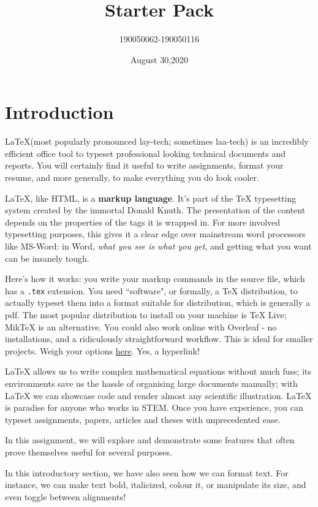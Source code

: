 \documentclass[a4paper]{article}
\title{\latex Starter Pack}
\author{190050062-190050116}
\date{August 30,2020}
\newcommand{\latex}{\LaTeX\xspace}
\newcommand{\tex}{\TeX\xspace}
\begin{document}
\maketitle
\tableofcontents
\thispagestyle{empty}
\setcounter{page}{0}
\newpage


\section{Introduction}
\latex (most popularly pronounced lay-tech; sometimes laa-tech) is an incredibly efficient office tool to typeset professional looking technical documents and reports. You will certainly find it useful to write assignments, format your resume, and more generally, to make everything you do look cooler.\par
\latex, like HTML, is a \textbf{markup language}. It's part of the \tex typesetting system created by the immortal Donald Knuth. The presentation of the content depends on the properties of the tags it is wrapped in. For more involved typesetting purposes, this gives it a clear edge over mainstream word processors like MS-Word: in Word, \textit{what you see is what you get}, and getting what you want can be insanely tough.\par
Here's how it works: you write your markup commands in the source file, which has a \texttt{.tex} extension. You need ``software", or formally, a \tex distribution, to actually typeset them into a format suitable for distribution, which is generally a pdf. The most popular distribution to install on your machine is TeX Live; MikTeX is an alternative. You could also work online with Overleaf - no installations, and a ridiculously straightforward workflow. This is ideal for smaller projects. Weigh your options \href{https://www.latex-project.org/get/}{here}. Yes, a hyperlink!\par
\latex allows us to write complex mathematical equations without much fuss; its environments save us the hassle of organising large documents manually; with \latex we can showcase code and render almost any scientific illustration. \latex is paradise for anyone who works in STEM. Once you have experience, you can typeset assignments, papers, articles and theses with unprecedented ease.\par
In this assignment, we will explore and demonstrate some features that often prove themselves useful for several purposes.\par
\begin{large}
In this introductory section, we have also seen how we can format text. For instance, we can make text bold, italicized, colour it, or manipulate its size, and even toggle between alignments!\par
\end{large}
\end{document}
